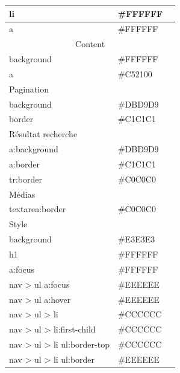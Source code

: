 \documentclass[letter, 11pt]{report}
\begin{document}
\begin{table}[h]
\begin{center}
\begin{tabular}{|l|l|l|}
		li         					& \#FFFFFF & \cellcolor[HTML]{FFFFFF} \\ \hline
		a          					& \#FFFFFF & \cellcolor[HTML]{FFFFFF} \\ \hline
		\multicolumn{3}{|c|}{Content} \\ \hline
		background 					& \#FFFFFF & \cellcolor[HTML]{FFFFFF} \\ \hline
		a							& \#C52100 & \cellcolor[HTML]{C52100} \\ \hline
		\multicolumn{3}{|l|}{Pagination} \\ \hline
		background 					& \#DBD9D9 & \cellcolor[HTML]{DBD9D9} \\ \hline
		border 	   					& \#C1C1C1 & \cellcolor[HTML]{C1C1C1} \\ \hline
		\multicolumn{3}{|l|}{Résultat recherche} \\ \hline
		a:background 				& \#DBD9D9 & \cellcolor[HTML]{DBD9D9} \\ \hline
		a:border   					& \#C1C1C1 & \cellcolor[HTML]{C1C1C1} \\ \hline
		tr:border  					& \#C0C0C0 & \cellcolor[HTML]{C0C0C0} \\ \hline
		\multicolumn{3}{|l|}{Médias} \\ \hline
		textarea:border 			& \#C0C0C0 & \cellcolor[HTML]{C0C0C0} \\ \hline
		\multicolumn{3}{|l|}{Style} \\ \hline
		background 					& \#E3E3E3 & \cellcolor[HTML]{E3E3E3} \\ \hline
		h1 							& \#FFFFFF & \cellcolor[HTML]{FFFFFF} \\ \hline
		a:focus 					& \#FFFFFF & \cellcolor[HTML]{FFFFFF} \\ \hline
		nav > ul a:focus 			& \#EEEEEE & \cellcolor[HTML]{EEEEEE} \\ \hline
		nav > ul a:hover 			& \#EEEEEE & \cellcolor[HTML]{EEEEEE} \\ \hline
		nav > ul > li 				& \#CCCCCC & \cellcolor[HTML]{CCCCCC} \\ \hline
		nav > ul > li:first-child 	& \#CCCCCC & \cellcolor[HTML]{CCCCCC} \\ \hline
		nav > ul > li ul:border-top & \#CCCCCC & \cellcolor[HTML]{CCCCCC} \\ \hline
		nav > ul > li ul:border 	& \#EEEEEE & \cellcolor[HTML]{EEEEEE} \\ \hline
		\end{tabular}
	\end{center}
\end{table}
\end{document}
